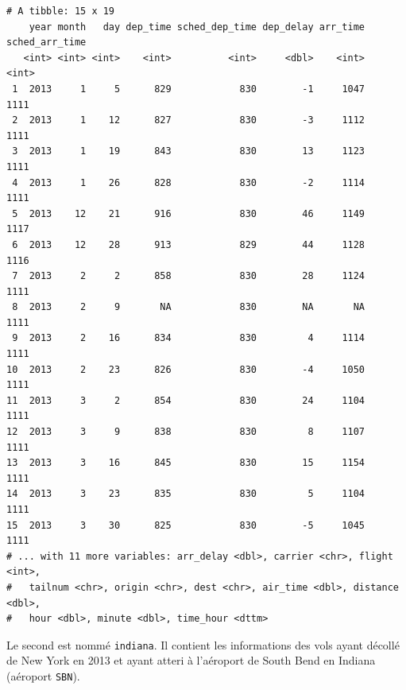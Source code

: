 \documentclass[a4paperpaper,]{article}
\newenvironment{Shaded}{\begin{snugshade}}{\end{snugshade}}
\newcommand{\KeywordTok}[1]{\textcolor[rgb]{0.13,0.29,0.53}{\textbf{#1}}}
\newcommand{\StringTok}[1]{\textcolor[rgb]{0.31,0.60,0.02}{#1}}
\newcommand{\OperatorTok}[1]{\textcolor[rgb]{0.81,0.36,0.00}{\textbf{#1}}}
\newcommand{\NormalTok}[1]{#1}
\theoremstyle{definition}
\theoremstyle{definition}
\theoremstyle{definition}
\theoremstyle{remark}
\begin{document}
\begin{verbatim}
# A tibble: 15 x 19
    year month   day dep_time sched_dep_time dep_delay arr_time sched_arr_time
   <int> <int> <int>    <int>          <int>     <dbl>    <int>          <int>
 1  2013     1     5      829            830        -1     1047           1111
 2  2013     1    12      827            830        -3     1112           1111
 3  2013     1    19      843            830        13     1123           1111
 4  2013     1    26      828            830        -2     1114           1111
 5  2013    12    21      916            830        46     1149           1117
 6  2013    12    28      913            829        44     1128           1116
 7  2013     2     2      858            830        28     1124           1111
 8  2013     2     9       NA            830        NA       NA           1111
 9  2013     2    16      834            830         4     1114           1111
10  2013     2    23      826            830        -4     1050           1111
11  2013     3     2      854            830        24     1104           1111
12  2013     3     9      838            830         8     1107           1111
13  2013     3    16      845            830        15     1154           1111
14  2013     3    23      835            830         5     1104           1111
15  2013     3    30      825            830        -5     1045           1111
# ... with 11 more variables: arr_delay <dbl>, carrier <chr>, flight <int>,
#   tailnum <chr>, origin <chr>, dest <chr>, air_time <dbl>, distance <dbl>,
#   hour <dbl>, minute <dbl>, time_hour <dttm>
\end{verbatim}

Le second est nommé \texttt{indiana}. Il contient les informations des
vols ayant décollé de New York en 2013 et ayant atteri à l'aéroport de
South Bend en Indiana (aéroport \texttt{SBN}).

\begin{Shaded}
\end{Shaded}
\end{document}
